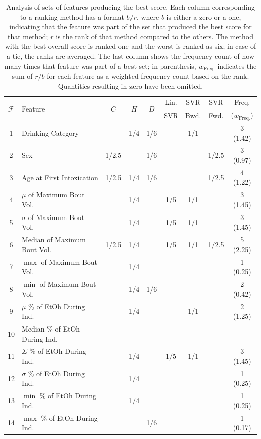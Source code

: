 \documentclass{bmcart}
\begin{document}
\begin{table}[t]
\caption{Analysis of sets of features producing the best score. Each column
corresponding to a ranking method has a format $b/r$, where $b$ is either a
zero or a one, indicating that the feature was part of the set that produced
the best score for that method; $r$ is the rank of that method compared to the
others. The method with the best overall score is ranked one and the worst is
ranked as six; in case of a tie, the ranks are averaged. The last column shows
the frequency count of how many times that feature was part of a best set; in
parenthesis, $w_\text{Freq.}$ indicates the sum of $r/b$ for each feature as a
weighted frequency count based on the rank. Quantities resulting in zero have
been omitted.}
      \begin{tabular}{clccccccc}
        \hline
\multirow{2}{*}{$\mathcal{F}$} & 
\multirow{2}{*}{Feature} & 
\multirow{2}{*}{$C$} &
\multirow{2}{*}{$H$} &
\multirow{2}{*}{$D$} &
Lin. &
SVR &
SVR & 
Freq. \\
   &                                 &       &       &     &  SVR & Bwd. &  Fwd. &  ($w_\text{Freq.}$) \\ \hline
1  & Drinking Category               &       &   1/4 & 1/6 &      &  1/1 &       &  3 (1.42) \\
2  & Sex                             & 1/2.5 &       & 1/6 &      &      & 1/2.5 &  3 (0.97) \\
3  & Age at First Intoxication       & 1/2.5 &   1/4 & 1/6 &      &      & 1/2.5 &  4 (1.22)\\
4  & $\mu$ of Maximum Bout Vol.      &       &   1/4 &     &  1/5 &  1/1 &       &  3 (1.45)\\
5  & $\sigma$ of Maximum Bout Vol.   &       &   1/4 &     &  1/5 &  1/1 &       &  3 (1.45)\\
6  & Median of Maximum Bout Vol.     & 1/2.5 &   1/4 &     &  1/5 &  1/1 & 1/2.5 &  5 (2.25)\\
7  & $\max$ of Maximum Bout Vol.     &       &   1/4 &     &      &      &       &  1 (0.25)\\
8  & $\min$ of Maximum Bout Vol.     &       &   1/4 & 1/6 &      &      &       &  2 (0.42)\\
9  & $\mu$ \% of EtOh During Ind.    &       &   1/4 &     &      &  1/1 &       &  2 (1.25)\\
10 & Median \% of EtOh During Ind.   &       &       &     &      &      &       &   \\
11 & $\Sigma$ \% of EtOh During Ind. &       &   1/4 &     &  1/5 &  1/1 &       &  3 (1.45) \\
12 & $\sigma$ \% of EtOh During Ind. &       &   1/4 &     &      &      &       &  1 (0.25)\\
13 & $\min$ \% of EtOh During Ind.   &       &   1/4 &     &      &      &       &  1 (0.25)\\ 
14 & $\max$ \% of EtOh During Ind.   &       &       & 1/6 &      &      &       &  1 (0.17)\\ \hline
      \end{tabular}
\label{tbl:bestfeats}
\end{table}
\end{document}
